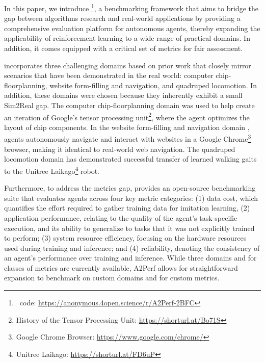 In this paper, we introduce \method\footnote{\method~code: \url{https://anonymous.4open.science/r/A2Perf-2BFC}}, a benchmarking framework that aims to bridge the gap between algorithms research and real-world applications by providing a comprehensive evaluation platform for autonomous agents, thereby expanding the applicability of reinforcement learning to a wide range of practical domains. In addition, it comes equipped with a critical set of metrics for fair assessment.

\method incorporates three challenging domains based on prior work \citep{coumans2023motion, mirhoseini2021graph, gur2021environment} that closely mirror scenarios that have been demonstrated in the real world: computer chip-floorplanning, website form-filling and navigation, and quadruped locomotion.
In addition, these domains were chosen because they inherently exhibit a small Sim2Real gap.
The computer chip-floorplanning domain \citep{mirhoseini2020chip_placement, mirhoseini2021graph} was used to help create an iteration of Google's tensor processing unit\footnote{History of the Tensor Processing Unit: \url{https://shorturl.at/Bo71S}}, where the agent optimizes the layout of chip components.
In the website form-filling and navigation domain \citep{gur2018learning_to_navigate_the_web, gur2021environment}, agents autonomously navigate and interact with websites in a Google Chrome\footnote{Google Chrome Browser: \url{ https://www.google.com/chrome/}} browser, making it identical to real-world web navigation.
The quadruped locomotion domain \citep{peng2020learning_agile_imitate} has demonstrated successful transfer of learned walking gaits to the Unitree Laikago\footnote{Unitree Laikago: \url{https://shorturl.at/FD6uP}} robot. 

Furthermore, to address the metrics gap, \method provides an open-source benchmarking suite that evaluates agents across four key metric categories: (1) data cost, which quantifies the effort required to gather training data for imitation learning, (2) application performance, relating to the quality of the agent's task-specific execution, and its ability to generalize to tasks that it was not explicitly trained to perform; (3) system resource efficiency, focusing on the hardware resources used during training and inference; and (4) reliability, denoting the consistency of an agent's performance over training and inference. While three domains and for classes of metrics are currently available, A2Perf allows for straightforward expansion to benchmark on custom domains and for custom metrics.


